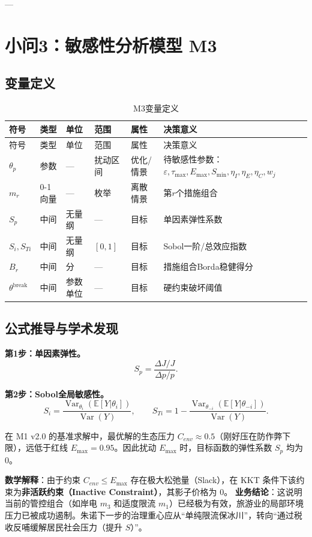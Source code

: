\documentclass[UTF8,a4paper,12pt]{ctexart}
\begin{document}
---

\section{小问3：敏感性分析模型 M3}

\subsection{变量定义}

\begin{longtable}{@{}p{1.5cm}p{1.4cm}p{1.2cm}p{2.2cm}p{1.2cm}p{5.0cm}@{}}
\caption{M3变量定义}\\
\toprule
符号 & 类型 & 单位 & 范围 & 属性 & 决策意义\\
\midrule
\endfirsthead
\toprule
符号 & 类型 & 单位 & 范围 & 属性 & 决策意义\\
\midrule
\endhead
\(\theta_p\) & 参数 & — & 扰动区间 & 优化/情景 & 待敏感性参数：\(\varepsilon,\tau_{\max},E_{\max},S_{\min},\eta_I,\eta_E,\eta_C,w_j\)\\
\(m_r\) & 0-1向量 & — & 枚举 & 离散情景 & 第\(r\)个措施组合\\
\(S_p\) & 中间 & 无量纲 & — & 目标 & 单因素弹性系数\\
\(S_i,S_{Ti}\) & 中间 & 无量纲 & \([0,1]\) & 目标 & Sobol一阶/总效应指数\\
\(B_r\) & 中间 & 分 & — & 目标 & 措施组合Borda稳健得分\\
\(\theta^{\mathrm{break}}\) & 中间 & 参数单位 & — & 目标 & 硬约束破坏阈值\\
\bottomrule
\end{longtable}

\subsection{公式推导与学术发现}

\textbf{第1步：单因素弹性。}
\begin{equation}\tag{M3-1}
S_p=\frac{\Delta J/J}{\Delta p/p}.
\end{equation}

\textbf{第2步：Sobol全局敏感性。}
\begin{equation}\tag{M3-2}
S_i=\frac{\operatorname{Var}_{\theta_i}\left(\mathbb E[Y|\theta_i]\right)}{\operatorname{Var}(Y)},\qquad S_{Ti}=1-\frac{\operatorname{Var}_{\theta_{-i}}\left(\mathbb E[Y|\theta_{-i}]\right)}{\operatorname{Var}(Y)}.
\end{equation}

\begin{revisionbox}[title=v2.0 核心学术发现：生态非紧约束]
在 M1 v2.0 的基准求解中，最优解的生态压力 \(C_{env} \approx 0.5\)（刚好压在防作弊下限），远低于红线 \(E_{\max}=0.95\)。因此扰动 \(E_{\max}\) 时，目标函数的弹性系数 \(S_p\) 均为 0。

\textbf{数学解释}：由于约束 \(C_{env} \le E_{\max}\) 存在极大松弛量（Slack），在 KKT 条件下该约束为\textbf{非活跃约束（Inactive Constraint）}，其影子价格为 0。
\textbf{业务结论}：这说明当前的管控组合（如岸电 \(m_3\) 和适度限流 \(m_1\)）已经极为有效，旅游业的局部环境压力已被成功遏制。朱诺下一步的治理重心应从“单纯限流保冰川”，转向“通过税收反哺缓解居民社会压力（提升 \(S\)）”。
\end{revisionbox}
\end{document}
